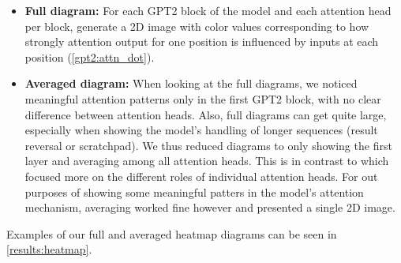 \begin{itemize}
	\item \textbf{Full diagram:} For each GPT2 block of the model and each attention head per block, generate a 2D image with color values corresponding to how strongly attention output for one position is influenced by inputs at each position (\cref{gpt2:attn_dot}).
	\item \textbf{Averaged diagram:} When looking at the full diagrams, we noticed meaningful attention patterns only in the first GPT2 block, with no clear difference between attention heads. Also, full diagrams can get quite large, especially when showing the model's handling of longer sequences (result reversal or scratchpad). We thus reduced diagrams to only showing the first layer and averaging among all attention heads. This is in contrast to \cite{bertsecrets} which focused more on the different roles of individual attention heads. For out purposes of showing some meaningful patters in the model's attention mechanism, averaging worked fine however and presented a single 2D image.
\end{itemize}

Examples of our full and averaged heatmap diagrams can be seen in \cref{results:heatmap}.
